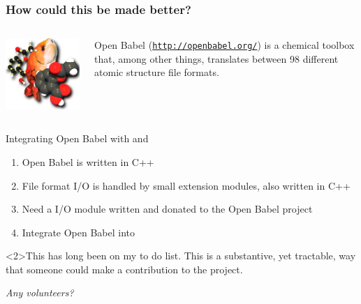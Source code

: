 \documentclass[10pt, xcolor=x11names, compress]{beamer}
\begin{document}
\begin{frame}
  \frametitle{How could this be made better?}
  \begin{columns}
    \begin{column}{0.2\linewidth}
      \includegraphics[width=\linewidth]{images/babel256.png}
    \end{column}
    \begin{column}{0.8\linewidth}
      Open Babel (\href{http://openbabel.org/}
      {\color{Blue2}\texttt{http://openbabel.org/}}) is a chemical
      toolbox that, among other things, translates between 98
      different atomic structure file formats.
    \end{column}
  \end{columns}
  \begin{block}{Integrating Open Babel with {\feff} and {\artemis}}
    \begin{enumerate}
    \item Open Babel is written in C++
    \item File format I/O is handled by small extension modules, also
      written in C++
    \item Need a  I/O module written and donated to the
      Open Babel project
    \item Integrate Open Babel into {\artemis}
    \end{enumerate}
  \end{block}
  \begin{alertblock}<2>{This has long been on my to do list.}
    This is a substantive, yet tractable, way that someone could make
    a contribution to the {\ifeffit} project.

    \smallskip

    \textit{Any volunteers?}
  \end{alertblock}
\end{frame}
\end{document}
